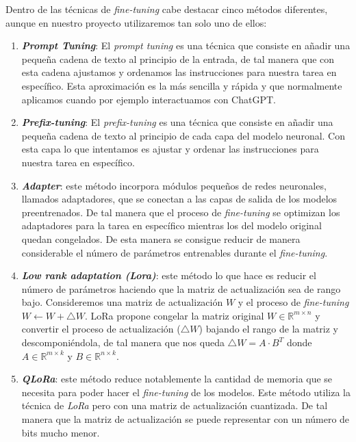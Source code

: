 Dentro de las técnicas de \textit{fine-tuning} cabe destacar cinco métodos diferentes, aunque en
nuestro proyecto utilizaremos tan solo uno de ellos:

\begin{enumerate}
    \item \textit{\textbf{Prompt Tuning}}: El \textit{prompt tuning} es una técnica que consiste en
        añadir una pequeña cadena de texto al principio de la entrada, de tal manera que
        con esta cadena ajustamos y ordenamos las instrucciones para nuestra tarea en
        específico. Esta aproximación es la más sencilla y rápida y que normalmente aplicamos
        cuando por ejemplo interactuamos con ChatGPT.
    \item \textit{\textbf{Prefix-tuning}}: El \textit{prefix-tuning} es una técnica que consiste en
        añadir una pequeña cadena de texto al principio de cada capa del modelo neuronal.
        Con esta capa lo que intentamos es ajustar y ordenar las instrucciones para nuestra
        tarea en específico.
    \item \textit{\textbf{Adapter}}: este método incorpora módulos pequeños de redes neuronales,
        llamados adaptadores, que se conectan a las capas de salida de los modelos
        preentrenados. De tal manera que el proceso de \textit{fine-tuning} se optimizan los
        adaptadores para la tarea en específico mientras los del modelo original
        quedan congelados. De esta manera se consigue reducir de manera considerable
        el número de parámetros entrenables durante el \textit{fine-tuning}.
    \item \textit{\textbf{Low rank adaptation (Lora)}}: este método lo que hace es 
        reducir el número de parámetros haciendo que la matriz de actualización sea de rango bajo.
        Consideremos una matriz de actualización $W$ y el proceso de \textit{fine-tuning}
        $W\leftarrow W + \bigtriangleup W$. LoRa propone congelar la matriz original
        $W\in \mathbb{R}^{m\times n}$ y convertir el proceso de actualización ($\bigtriangleup W$)
        bajando el rango de la matriz y descomponiéndola, de tal manera que nos queda
        $\bigtriangleup W = A\cdot B^T$ donde $A\in \mathbb{R}^{m\times k}$ y $B\in \mathbb{R}^{n\times k}$.
        \cite{ZhaoWayneXin2023ASoL}
    \item \textit{\textbf{QLoRa}}: este método reduce notablemente la cantidad de memoria
        que se necesita para poder hacer el \textit{fine-tuning} de los modelos. Este método
        utiliza la técnica de \textit{LoRa} pero con una matriz de actualización cuantizada. De tal
        manera que la matriz de actualización se puede representar con un número de bits
        mucho menor.\cite{DettmersTim2023QEFo}
\end{enumerate}

